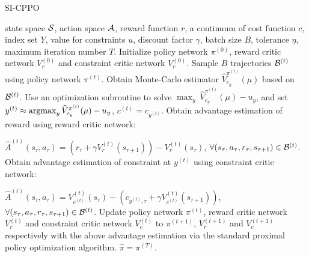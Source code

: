\begin{algorithm}[htb!]
   \caption{SI-CPPO}
   \label{Algorithm_SICPPO}
\begin{algorithmic}
    state space ${\mathcal{S}}$, action space ${\mathcal{A}}$, reward function $r$, a continuum of cost function $c$, index set $Y$, value for constraints $u$, discount factor $\gamma$, batch size $B$, tolerance $\eta$, maximum iteration number $T$.
   \STATE Initialize policy network $\pi^{(0)}$, reward critic network $V_r^{(0)}$ and constraint critic network $V^{(0)}_c$.
   \STATE Sample $B$ trajectories ${\mathcal{B}}^{(t)}$ using policy network $\pi^{(t)}$.
   \STATE Obtain Monte-Carlo estimator $\widehat V_{c_y}^{\pi^{(t)}}(\mu)$ based on ${\mathcal{B}}^{(t)}$.
   \STATE Use an optimization subroutine to solve ${\max_y\ \widehat V_{c_y}^{\pi^{(t)}}(\mu)-u_y}$, and set ${y^{(t)}\approx\operatorname*{argmax}_y \widehat V_{c_y}^{\pi^{(t)}}(\mu)-u_y}$, $c^{(t)}=c_{y^{(t)}}$.
   \STATE  Obtain advantage estimation of reward using reward critic network: 
   
   $\hat{A}^{(t)}(s_\tau,a_\tau)=\left(r_\tau+\gamma V_r^{(t)}(s_{\tau+1}) \right)-V_r^{(t)}(s_{\tau})$, $\forall (s_\tau, a_\tau, r_\tau, s_{\tau+1})\in {\mathcal{B}}^{(t)}$.
   \ELSE 
   \STATE  Obtain advantage estimation of constraint at $y^{(t)}$ using constraint critic network: 
   
   $\hat{A}^{(t)}(s_\tau,a_\tau)=V^{(t)}_{c^{(t)}}(s_{\tau})-\left(c_{y^{(t)},\tau}+\gamma V^{(t)}_{c^{(t)}}(s_{\tau+1}) \right)$,  $\forall(s_\tau, a_\tau, r_\tau, s_{\tau+1})\in {\mathcal{B}}^{(t)}$.
   \ENDIF
   \STATE Update policy network $\pi^{(t)}$, reward critic network $V_r^{(t)}$ and constraint critic network $V^{(t)}_c$ to $\pi^{(t+1)}$, $V_r^{(t+1)}$ and $V^{(t+1)}_c$ respectively with the above advantage estimation via the standard proximal policy optimization algorithm.
   \ENDFOR
    $\hat\pi=\pi^{(T)}$.
\end{algorithmic}
\end{algorithm}



